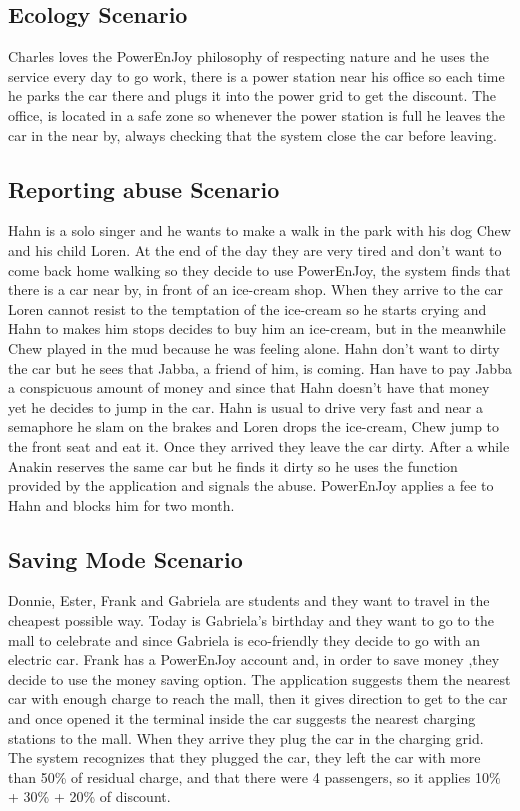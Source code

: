 \subsection{Ecology Scenario}
Charles loves the PowerEnJoy philosophy of respecting nature and he uses the service every day to go work, there is a power station near his office so each time he parks the car there and plugs it into the power grid to get the discount. The office, is located in a safe zone so whenever the power station is full he leaves the car in the near by, always checking that the system close the car before leaving.

\subsection{Reporting abuse Scenario}
Hahn is a solo singer and he wants to make a walk in the park with his dog Chew and his child Loren. At the end of the day they are very tired and don't want to come back home walking so they decide to use PowerEnJoy, the system finds that there is a car near by, in front of an ice-cream shop. When they arrive to the car Loren cannot resist to the temptation of the ice-cream so he starts crying and Hahn to makes him stops decides to buy him an ice-cream, but in the meanwhile Chew played in the mud because he was feeling alone. Hahn don't want to dirty the car but he sees that Jabba, a friend of him, is coming. Han have to pay Jabba a conspicuous amount of money and since that Hahn doesn't have that money yet he decides to jump in the car. Hahn is usual to drive very fast and near a semaphore he slam on the brakes and Loren drops the ice-cream, Chew jump to the front seat and eat it. Once they arrived they leave the car dirty. After a while Anakin reserves the same car but he finds it dirty so he uses the function provided by the application and signals the abuse. PowerEnJoy applies a fee to Hahn and blocks him for two month.

\subsection{Saving Mode Scenario}
Donnie, Ester, Frank and Gabriela are students and they want to travel in the cheapest possible way. Today is Gabriela's birthday and they want to go to the mall to celebrate and since Gabriela is eco-friendly they decide to go with an electric car. Frank has a PowerEnJoy account and, in order to save money ,they decide to use the money saving option. The application suggests them the nearest car with enough charge to reach the mall, then it gives direction to get to the car and once opened it the terminal inside the car suggests the nearest charging stations to the mall. When they arrive they plug the car in the charging grid. The system recognizes that they plugged the car, they left the car with more than 50\% of residual charge, and that there were 4 passengers, so it applies 10\% + 30\% + 20\% of discount.